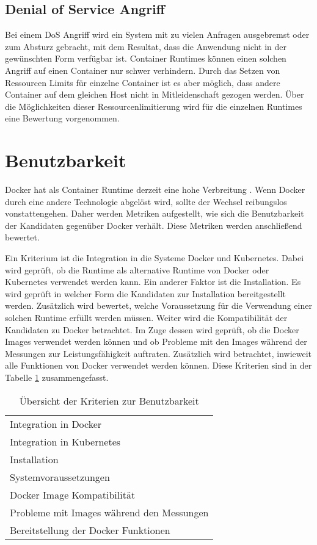 \subsection{Denial of Service Angriff}
Bei einem \ac{DoS} Angriff wird ein System mit zu vielen  Anfragen ausgebremst oder zum Absturz gebracht, mit dem Resultat, dass die Anwendung nicht in der gewünschten Form verfügbar ist. Container Runtimes können einen solchen Angriff auf einen Container nur schwer verhindern. Durch das Setzen von Ressourcen Limits für einzelne Container ist es aber möglich, dass andere Container auf dem gleichen Host nicht in Mitleidenschaft gezogen werden. Über die Möglichkeiten dieser Ressourcenlimitierung wird für die einzelnen Runtimes eine Bewertung vorgenommen.

\section{Benutzbarkeit}
\label{sec:benutzbarkeit_krit}
Docker hat als Container Runtime derzeit eine hohe Verbreitung \cite[vgl.][5]{sysdig.2019}. Wenn Docker durch eine andere Technologie abgelöst wird, sollte der Wechsel reibungslos vonstattengehen. Daher werden Metriken aufgestellt, wie sich die Benutzbarkeit der Kandidaten gegenüber Docker verhält. Diese Metriken werden anschließend bewertet.

Ein Kriterium ist die Integration in die Systeme Docker und Kubernetes. Dabei wird geprüft, ob die Runtime als alternative Runtime von Docker oder Kubernetes verwendet werden kann. Ein anderer Faktor ist die Installation. Es wird geprüft in welcher Form die Kandidaten zur Installation bereitgestellt werden. Zusätzlich wird bewertet, welche Voraussetzung für die Verwendung einer solchen Runtime erfüllt werden müssen. Weiter wird die Kompatibilität der Kandidaten zu Docker betrachtet. Im Zuge dessen wird geprüft, ob die Docker Images verwendet werden können und ob Probleme mit den Images während der Messungen zur Leistungsfähigkeit auftraten. Zusätzlich wird betrachtet, inwieweit alle Funktionen von Docker verwendet werden können. Diese Kriterien sind in der Tabelle \ref{tbl:benutzbarkeit_zusm} zusammengefasst.

\begin{table}[h]
	\small
	\myfloatalign
	\begin{tabularx}{\textwidth}{X} \hline
		\spacedlowsmallcaps{Kriterien zur Benutzbarkeit} \\\hline
		Integration in Docker\\
		Integration in Kubernetes\\
		Installation\\
		Systemvoraussetzungen\\
		Docker Image Kompatibilität\\
		Probleme mit Images während den Messungen\\
		Bereitstellung der Docker Funktionen\\ \hline
	\end{tabularx}
	\caption{Übersicht der Kriterien zur Benutzbarkeit}
	\label{tbl:benutzbarkeit_zusm}
\end{table}
\newpage

